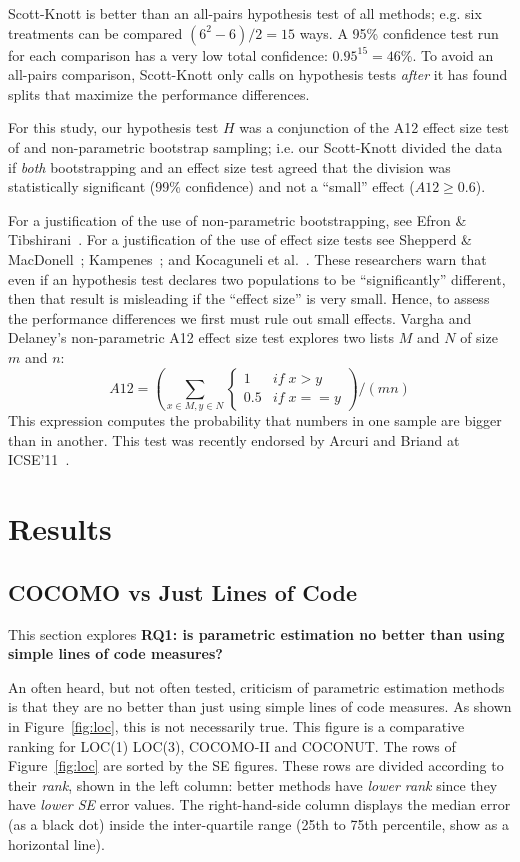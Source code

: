 \documentclass[smallcondesed]{svjour3}
\newcommand{\fig}[1]{Figure~\ref{fig:#1}}
\begin{document}
Scott-Knott is better than an 
 all-pairs hypothesis test of all methods; e.g. six treatments
can be compared \mbox{$(6^2-6)/2=15$} ways. 
A 95\% confidence test run for each comparison has  a very low total confidence: 
\mbox{$0.95^{15} = 46$}\%.
To avoid an all-pairs comparison, Scott-Knott only calls on hypothesis
tests {\em after} it has found splits that maximize the performance differences.
 
For this study, our hypothesis test $H$ was a
conjunction of the A12 effect size test of  and
non-parametric bootstrap sampling; i.e. our
Scott-Knott divided the data if {\em both}
bootstrapping and an effect size test agreed that
the division was statistically significant (99\%
confidence) and not a ``small'' effect ($A12 \ge
0.6$).

For a justification of the use of non-parametric
bootstrapping, see Efron \&
Tibshirani~\cite[p220-223]{efron93}.
For a justification of the use of effect size tests
see Shepperd \& MacDonell~\cite{shepperd12a}; Kampenes~\cite{kampenes07}; and
Kocaguneli et al.~\cite{kocharm13}. These researchers
warn that even if an
hypothesis test declares two populations to be
``significantly'' different, then that result is
misleading if the ``effect size'' is very small.
Hence, to assess 
the performance differences 
we first must rule out small effects.
Vargha and Delaney's
non-parametric 
A12 effect size test 
explores
two lists $M$ and $N$ of size $m$ and $n$:
\[A12 = \left(\sum_{x\in M, y \in N} 
\begin{cases} 
1   & \mathit{if}\; x > y\\
0.5 & \mathit{if}\; x == y
\end{cases}\right) / (mn)
\]
This expression computes the probability that numbers in one sample are bigger than in another.
This test was recently 
endorsed by Arcuri and Briand
at ICSE'11~\cite{arcuri11}.





\section{Results}
\subsection{COCOMO vs Just Lines of Code}\label{sect:justloc}
This section explores {\bf RQ1:
is parametric estimation no better than 
using simple lines of code measures?}

An often heard, but not often tested, criticism of parametric
estimation methods is that they are no
better than just using simple lines of code measures.
As shown in \fig{loc}, this is not necessarily true.
This figure is a comparative ranking for LOC(1)
LOC(3), COCOMO-II and COCONUT.
The rows of \fig{loc} are sorted by the SE figures.
These rows are divided according to their 
 {\em rank}, shown in the left column: better methods
have {\em lower rank} since they have {\em lower SE} error values.
The right-hand-side column displays the median error (as a black dot)
inside the inter-quartile range
(25th to 75th percentile, show as a horizontal line).
\end{document}
